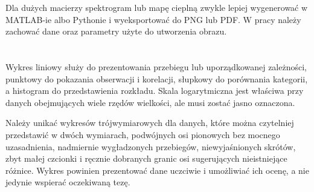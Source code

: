Dla dużych macierzy spektrogram lub mapę cieplną zwykle lepiej wygenerować w MATLAB-ie albo Pythonie i wyeksportować do PNG lub PDF. W pracy należy zachować dane oraz parametry użyte do utworzenia obrazu.

\section{}

Wykres liniowy służy do prezentowania przebiegu lub uporządkowanej zależności, punktowy do pokazania obserwacji i korelacji, słupkowy do porównania kategorii, a histogram do przedstawienia rozkładu. Skala logarytmiczna jest właściwa przy danych obejmujących wiele rzędów wielkości, ale musi zostać jasno oznaczona.

Należy unikać wykresów trójwymiarowych dla danych, które można czytelniej przedstawić w dwóch wymiarach, podwójnych osi pionowych bez mocnego uzasadnienia, nadmiernie wygładzonych przebiegów, niewyjaśnionych skrótów, zbyt małej czcionki i ręcznie dobranych granic osi sugerujących nieistniejące różnice. Wykres powinien prezentować dane uczciwie i umożliwiać ich ocenę, a nie jedynie wspierać oczekiwaną tezę.
